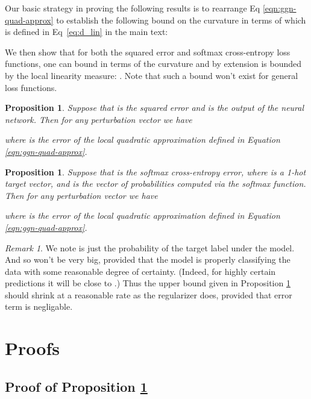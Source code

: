 \documentclass{article}
\theoremstyle{plain}
\newtheorem{prop}[thm]{Proposition}
\theoremstyle{definition}
\theoremstyle{remark}
\newtheorem*{rem}{Remark}
\begin{document}
Our basic strategy in proving the following results is to rearrange Eq
\eqref{eqn:ggn-quad-approx} to establish the following bound on the curvature in
terms of  which is defined in Eq~\eqref{eq:d_lin} in the main text:

We then show that for both the squared error and softmax cross-entropy loss
functions, one can bound  in terms of the
curvature  and by extension is bounded by the local linearity measure: . Note that such a bound won't exist for general loss functions.

\begin{prop}
  \label{prop:square_error_bound}Suppose that  is the squared error and  is the output of the neural network. Then for any perturbation vector  we
  have
  
  where  is the error of the local quadratic approximation
  defined in Equation \ref{eqn:ggn-quad-approx}.
\end{prop}

\begin{prop}
  \label{prop:cross_entropy_bound}Suppose that  is the softmax cross-entropy error, where  is a 1-hot target
  vector, and  is the vector of probabilities computed via the softmax
  function. Then for any perturbation vector  we have
  
  where  is the error of the local quadratic approximation
  defined in Equation \ref{eqn:ggn-quad-approx}.
\end{prop}

\begin{rem}
  We note  is just the probability of the target label under the
  model. And so  won't be very big, provided that the model is
  properly classifying the data with some reasonable degree of certainty.
  (Indeed, for highly certain predictions it will be close to .) Thus the
  upper bound given in Proposition \ref{prop:cross_entropy_bound} should
  shrink at a reasonable rate as the regularizer  does,
  provided that error term  is negligable.
\end{rem}

\section{Proofs}

\subsection{Proof of Proposition \ref{prop:square_error_bound}}
\end{document}
